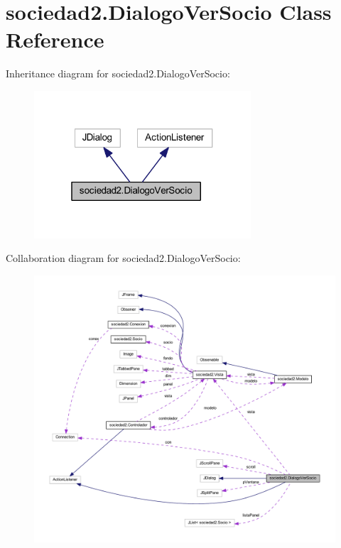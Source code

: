 \hypertarget{classsociedad2_1_1_dialogo_ver_socio}{}\section{sociedad2.\+Dialogo\+Ver\+Socio Class Reference}
\label{classsociedad2_1_1_dialogo_ver_socio}


Inheritance diagram for sociedad2.\+Dialogo\+Ver\+Socio\+:
\nopagebreak
\begin{figure}[H]
\begin{center}
\leavevmode
\includegraphics[width=229pt]{classsociedad2_1_1_dialogo_ver_socio__inherit__graph}
\end{center}
\end{figure}


Collaboration diagram for sociedad2.\+Dialogo\+Ver\+Socio\+:
\nopagebreak
\begin{figure}[H]
\begin{center}
\leavevmode
\includegraphics[width=350pt]{classsociedad2_1_1_dialogo_ver_socio__coll__graph}
\end{center}
\end{figure}
